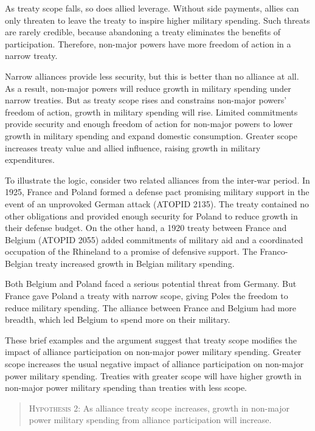 \documentclass[12pt]{article}
\begin{document}
As treaty scope falls, so does allied leverage. 
Without side payments, allies can only threaten to leave the treaty to inspire higher military spending. 
Such threats are rarely credible, because abandoning a treaty eliminates the benefits of participation. 
Therefore, non-major powers have more freedom of action in a narrow treaty.  


Narrow alliances provide less security, but this is better than no alliance at all. 
As a result, non-major powers will reduce growth in military spending under narrow treaties. 
But as treaty scope rises and constrains non-major powers' freedom of action, growth in military spending will rise. 
Limited commitments provide security and enough freedom of action for non-major powers to lower growth in military spending and expand domestic consumption. 
Greater scope increases treaty value and allied influence, raising growth in military expenditures. 


To illustrate the logic, consider two related alliances from the inter-war period. 
In 1925, France and Poland formed a defense pact promising military support in the event of an unprovoked German attack (ATOPID 2135). 
The treaty contained no other obligations and provided enough security for Poland to reduce growth in their defense budget.
On the other hand, a 1920 treaty between France and Belgium (ATOPID 2055) added commitments of military aid and a coordinated occupation of the Rhineland to a promise of defensive support. 
The Franco-Belgian treaty increased growth in Belgian military spending. 


Both Belgium and Poland faced a serious potential threat from Germany. 
But France gave Poland a treaty with narrow scope, giving Poles the freedom to reduce military spending. 
The alliance between France and Belgium had more breadth, which led Belgium to spend more on their military. 


These brief examples and the argument suggest that treaty scope modifies the impact of alliance participation on non-major power military spending. 
Greater scope increases the usual negative impact of alliance participation on non-major power military spending. 
Treaties with greater scope will have higher growth in non-major power military spending than treaties with less scope. 


\begin{quote}
\textsc{Hypothesis 2}: As alliance treaty scope increases, growth in non-major power military spending from alliance participation will increase. 
\end{quote}
\end{document}
